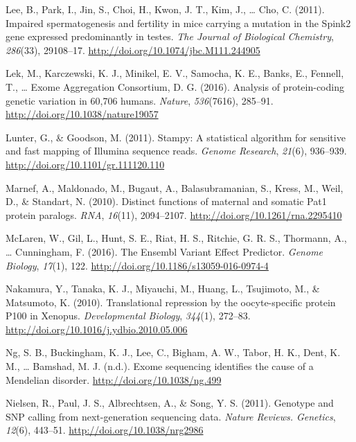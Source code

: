 \documentclass[12pt,twoside]{reedthesis}
\theoremstyle{definition}
\theoremstyle{definition}
\theoremstyle{remark}
\begin{document}
  \hypertarget{ref-Lee2011}{}
  Lee, B., Park, I., Jin, S., Choi, H., Kwon, J. T., Kim, J., \ldots{}
  Cho, C. (2011). Impaired spermatogenesis and fertility in mice carrying
  a mutation in the Spink2 gene expressed predominantly in testes.
  \emph{The Journal of Biological Chemistry}, \emph{286}(33), 29108--17.
  \url{http://doi.org/10.1074/jbc.M111.244905}
  
  \hypertarget{ref-Lek2016}{}
  Lek, M., Karczewski, K. J., Minikel, E. V., Samocha, K. E., Banks, E.,
  Fennell, T., \ldots{} Exome Aggregation Consortium, D. G. (2016).
  Analysis of protein-coding genetic variation in 60,706 humans.
  \emph{Nature}, \emph{536}(7616), 285--91.
  \url{http://doi.org/10.1038/nature19057}
  
  \hypertarget{ref-Lunter2011}{}
  Lunter, G., \& Goodson, M. (2011). Stampy: A statistical algorithm for
  sensitive and fast mapping of Illumina sequence reads. \emph{Genome
  Research}, \emph{21}(6), 936--939.
  \url{http://doi.org/10.1101/gr.111120.110}
  
  \hypertarget{ref-Marnef2010}{}
  Marnef, A., Maldonado, M., Bugaut, A., Balasubramanian, S., Kress, M.,
  Weil, D., \& Standart, N. (2010). Distinct functions of maternal and
  somatic Pat1 protein paralogs. \emph{RNA}, \emph{16}(11), 2094--2107.
  \url{http://doi.org/10.1261/rna.2295410}
  
  \hypertarget{ref-McLaren2016}{}
  McLaren, W., Gil, L., Hunt, S. E., Riat, H. S., Ritchie, G. R. S.,
  Thormann, A., \ldots{} Cunningham, F. (2016). The Ensembl Variant Effect
  Predictor. \emph{Genome Biology}, \emph{17}(1), 122.
  \url{http://doi.org/10.1186/s13059-016-0974-4}
  
  \hypertarget{ref-Nakamura2010}{}
  Nakamura, Y., Tanaka, K. J., Miyauchi, M., Huang, L., Tsujimoto, M., \&
  Matsumoto, K. (2010). Translational repression by the oocyte-specific
  protein P100 in Xenopus. \emph{Developmental Biology}, \emph{344}(1),
  272--83. \url{http://doi.org/10.1016/j.ydbio.2010.05.006}
  
  \hypertarget{ref-Ng}{}
  Ng, S. B., Buckingham, K. J., Lee, C., Bigham, A. W., Tabor, H. K.,
  Dent, K. M., \ldots{} Bamshad, M. J. (n.d.). Exome sequencing identifies
  the cause of a Mendelian disorder. \url{http://doi.org/10.1038/ng.499}
  
  \hypertarget{ref-Nielsen2011}{}
  Nielsen, R., Paul, J. S., Albrechtsen, A., \& Song, Y. S. (2011).
  Genotype and SNP calling from next-generation sequencing data.
  \emph{Nature Reviews. Genetics}, \emph{12}(6), 443--51.
  \url{http://doi.org/10.1038/nrg2986}
  
\end{document}
